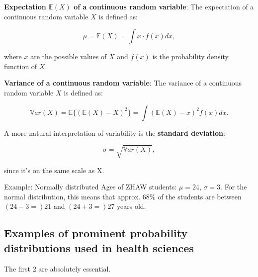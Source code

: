 \documentclass[
]{book}
\begin{document}
\textbf{Expectation \(\mathbb{E}(X)\) of a continuous random variable}: The expectation of a continuous random variable \(X\) is defined as:

\[\mu = \mathbb{E}(X) = \int x \cdot f(x) dx,\]

where \(x\) are the possible values of \(X\) and \(f(x)\) is the probability density function of \(X\).

\textbf{Variance of a continuous random variable}: The variance of a continuous random variable \(X\) is defined as:

\[\mathbb{V}ar(X) = \mathbb{E} \{ (\mathbb{E}(X) - X)^2 \} = \int (\mathbb{E}(X) - x)^2 f(x) dx.\]

A more natural interpretation of variability is the \textbf{standard deviation}:

\[\sigma = \sqrt{\mathbb{V}ar(X)},\]

since it's on the same scale as X.

Example: Normally distributed Ages of ZHAW students: \(\mu = 24\), \(\sigma = 3\). For the normal distribution,
this means that approx. 68\% of the students are between \((24-3=)21\) and \((24+3=)27\) years old.

\subsection{Examples of prominent probability distributions used in health sciences}\label{prominent_probability_distributions_in_health_sciences}

The first 2 are absolutely essential.
\end{document}
